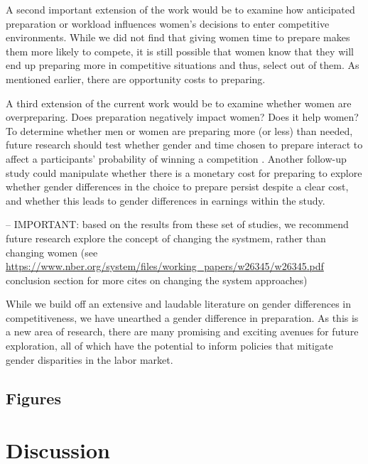 \documentclass[a4paper, nobind]{templates/ociamthesis}
\begin{document}
A second important extension of the work would be to examine how anticipated preparation or workload influences women's decisions to enter competitive environments. While we did not find that giving women time to prepare makes them more likely to compete, it is still possible that women know that they will end up preparing more in competitive situations and thus, select out of them. As mentioned earlier, there are opportunity costs to preparing.

A third extension of the current work would be to examine whether women are overpreparing. Does preparation negatively impact women? Does it help women? To determine whether men or women are preparing more (or less) than needed, future research should test whether gender and time chosen to prepare interact to affect a participants' probability of winning a competition \autocite[see][]{Niederle2007}. Another follow-up study could manipulate whether there is a monetary cost for preparing to explore whether gender differences in the choice to prepare persist despite a clear cost, and whether this leads to gender differences in earnings within the study.

-- IMPORTANT: based on the results from these set of studies, we recommend future research explore the concept of changing the systmem, rather than changing women (see \url{https://www.nber.org/system/files/working_papers/w26345/w26345.pdf} conclusion section for more cites on changing the system approaches)

While we build off an extensive and laudable literature on gender differences in competitiveness, we have unearthed a gender difference in preparation. As this is a new area of research, there are many promising and exciting avenues for future exploration, all of which have the potential to inform policies that mitigate gender disparities in the labor market.

\hypertarget{figures-1}{%
\section{Figures}\label{figures-1}}

\hypertarget{discussion-5}{%
\chapter*{Discussion}\label{discussion-5}}

\adjustmtc
{}
\end{document}
